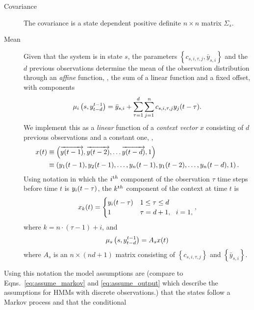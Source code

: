 \begin{description}
\item[Covariance] The covariance is a state dependent positive
  definite $n\times n$ matrix $\Sigma_s$.
\item[Mean] Given that the system is in state $s$, the parameters
  $\left\{ c_{s,i,\tau,j}, \bar y_{s,i} \right\}$ and the $d$ previous
  observations determine the mean of the observation distribution
  through an \emph{affine} function, \ie, the sum of a linear function
  and a fixed offset, with components
  \begin{equation}
    \label{eq:ARVGout1}
    \mu_i\left(s,y_{t-d}^{t-1}\right) = \bar y_{s,i} + \sum_{\tau =
    1}^d \sum_{j=1}^n c_{s,i,\tau,j} {y_j}{(t-\tau)}.
  \end{equation}
  We implement this as a \emph{linear} function of a \emph{context
    vector} $x$ consisting of $d$ previous observations and a constant
  one, \ie,
  \begin{align*}
    {x}{(t)} & \equiv \left( \overrightarrow{{y}{(t-1)}},
      \overrightarrow{{y}{(t-2)}},\ldots
      \overrightarrow{{y}{(t-d)}}, 1\right)\\
    & \equiv \left({y_1}{(t-1)}, {y_2}{(t-1)}, \ldots,
      {y_n}{(t-1)}, {y_1}{(t-2)}, \ldots, {y_n}{(t-d)}, 1 \right).
  \end{align*}
  Using notation in which the $i^{\text th}$ component of the observation
  $\tau$ time steps before time $t$ is ${y_i}{(t-\tau)}$, the $k^{\text th}$
  component of the context at time $t$ is
  \begin{equation}
    \label{eq:context}
    {x_{k}}{(t)} = \begin{cases} {y_i}{(t-\tau)} & 1\leq \tau \leq d
    \\ 1 & \tau = d+1,~~ i = 1, \end{cases},
  \end{equation}
  where $k=n\cdot(\tau-1) + i$, and
  \begin{equation}
    \label{eq:ARVGout2}
    \mu_s\left(s,y_{t-d}^{t-1}\right) = A_s {x}{(t)}
  \end{equation}
  where $A_s$ is an $n\times(nd+1)$ matrix consisting of $\left\{
    c_{s,i,\tau,j} \right\}$ and $\left\{ \bar y_{s,i} \right\}$.
\end{description}
Using this notation the model assumptions are (compare to
Eqns.~\eqref{eq:assume_markov} and \eqref{eq:assume_output} which
describe the assumptions for HMMs with discrete observations.) that
the states follow a Markov process and that the conditional
